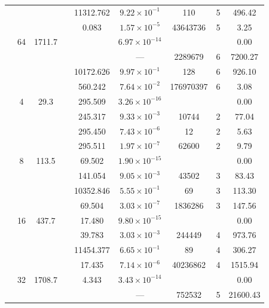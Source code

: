 \begin{table}[htbp]
\begin{tabular}{l S[table-format=3.0] S[table-format=4.1] l S[table-format=3.3] S[table-format=1.2e2] S[table-format=6.0] S[table-format=2.0] S[table-format=4.2]}
     &  &  &  & 11312.762 & $9.22 \times 10^{-1}$ & 110 & 5 & 496.42 \\
     &  &  &  & 0.083 & $1.57 \times 10^{-5}$ & 43643736 & 5 & 3.25 \\
     & 64 & 1711.7 &  & {\text{---}} & $6.97 \times 10^{-14}$ & {\text{---}} & {\text{---}} & 0.00 \\
     &  &  &  & {\text{---}} & ${\text{---}}$ & 2289679 & 6 & 7200.27 \\
     &  &  &  & 10172.626 & $9.97 \times 10^{-1}$ & 128 & 6 & 926.10 \\
     &  &  &  & 560.242 & $7.64 \times 10^{-2}$ & 176970397 & 6 & 3.08 \\
    \midrule
     & 4 & 29.3 &  & 295.509 & $3.26 \times 10^{-16}$ & {\text{---}} & {\text{---}} & 0.00 \\
     &  &  &  & 245.317 & $9.33 \times 10^{-3}$ & 10744 & 2 & 77.04 \\
     &  &  &  & 295.450 & $7.43 \times 10^{-6}$ & 12 & 2 & 5.63 \\
     &  &  &  & 295.511 & $1.97 \times 10^{-7}$ & 62600 & 2 & 9.79 \\
     & 8 & 113.5 &  & 69.502 & $1.90 \times 10^{-15}$ & {\text{---}} & {\text{---}} & 0.00 \\
     &  &  &  & 141.054 & $9.05 \times 10^{-3}$ & 43502 & 3 & 83.43 \\
     &  &  &  & 10352.846 & $5.55 \times 10^{-1}$ & 69 & 3 & 113.30 \\
     &  &  &  & 69.504 & $3.03 \times 10^{-7}$ & 1836286 & 3 & 147.56 \\
     & 16 & 437.7 &  & 17.480 & $9.80 \times 10^{-15}$ & {\text{---}} & {\text{---}} & 0.00 \\
     &  &  &  & 39.783 & $3.03 \times 10^{-3}$ & 244449 & 4 & 973.76 \\
     &  &  &  & 11454.377 & $6.65 \times 10^{-1}$ & 89 & 4 & 306.27 \\
     &  &  &  & 17.435 & $7.14 \times 10^{-6}$ & 40236862 & 4 & 1515.94 \\
     & 32 & 1708.7 &  & 4.343 & $3.43 \times 10^{-14}$ & {\text{---}} & {\text{---}} & 0.00 \\
     &  &  &  & {\text{---}} & ${\text{---}}$ & 752532 & 5 & 21600.43 \\

\end{tabular}
\end{table}
